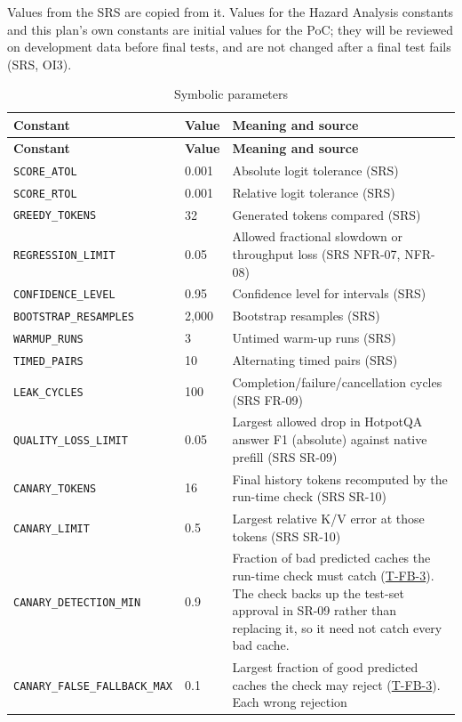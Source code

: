 \documentclass[12pt, titlepage]{article}
\newcommand{\cst}[1]{\texttt{#1}}
\newcommand{\tref}[1]{\hyperref[test:#1]{#1}}
\begin{document}
Values from the SRS are copied from it. Values for the Hazard Analysis
constants and this plan's own constants are initial values for the PoC;
they will be reviewed on development data before final tests, and are not
changed after a final test fails (SRS, OI3).

\begin{longtable}{@{}p{}p{}p{}@{}}
\caption{Symbolic parameters}\label{tab:constants}\\
\toprule \textbf{Constant} & \textbf{Value} & \textbf{Meaning and
source}\\\midrule
\endfirsthead
\toprule \textbf{Constant} & \textbf{Value} & \textbf{Meaning and
source}\\\midrule
\endhead
\cst{SCORE\_ATOL} & 0.001 & Absolute logit tolerance (SRS)\\
\cst{SCORE\_RTOL} & 0.001 & Relative logit tolerance (SRS)\\
\cst{GREEDY\_TOKENS} & 32 & Generated tokens compared (SRS)\\
\cst{REGRESSION\_LIMIT} & 0.05 & Allowed fractional slowdown or throughput
loss (SRS NFR-07, NFR-08)\\
\cst{CONFIDENCE\_LEVEL} & 0.95 & Confidence level for intervals (SRS)\\
\cst{BOOTSTRAP\_RESAMPLES} & 2,000 & Bootstrap resamples (SRS)\\
\cst{WARMUP\_RUNS} & 3 & Untimed warm-up runs (SRS)\\
\cst{TIMED\_PAIRS} & 10 & Alternating timed pairs (SRS)\\
\cst{LEAK\_CYCLES} & 100 & Completion/failure/cancellation cycles (SRS
FR-09)\\
\cst{QUALITY\_LOSS\_LIMIT} & 0.05 & Largest allowed drop in HotpotQA answer
F1 (absolute) against native prefill (SRS SR-09)\\
\cst{CANARY\_TOKENS} & 16 & Final history tokens recomputed by the run-time
check (SRS SR-10)\\
\cst{CANARY\_LIMIT} & 0.5 & Largest relative K/V error at those tokens
(SRS SR-10)\\
\cst{CANARY\_DETECTION\_MIN} & 0.9 & Fraction of bad predicted caches the
run-time check must catch (\tref{T-FB-3}). The check backs up the test-set
approval in SR-09 rather than replacing it, so it need not catch every bad
cache.\\
\cst{CANARY\_FALSE\_FALLBACK\_MAX} & 0.1 & Largest fraction of good
predicted caches the check may reject (\tref{T-FB-3}). Each wrong rejection

\end{longtable}
\end{document}
